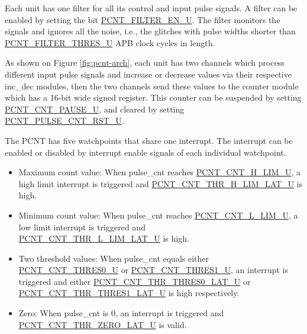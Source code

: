 \documentclass[main\_\_EN.tex]{subfiles}
\begin{document}
Each unit has one filter for all its control and input pulse signals. A filter can be enabled by setting the bit \hyperref[fielddesc:PCNTFILTERENUN]{PCNT\_FILTER\_EN\_U}. The filter monitors the signals and ignores all the noise, i.e., the glitches with pulse widths shorter than \hyperref[fielddesc:PCNTFILTERTHRESUN]{PCNT\_FILTER\_THRES\_U} APB clock cycles in length.

As shown on Figure \ref{fig:pcnt-arch}, each unit has two channels which process different input pulse signals and increase or decrease values via their respective inc\_dec modules, then the two channels send these values to the counter module which has a 16-bit wide signed register. This counter can be suspended by setting \hyperref[fielddesc:PCNTCNTPAUSEUN]{PCNT\_CNT\_PAUSE\_U}, and cleared by setting \hyperref[fielddesc:PCNTPULSECNTRSTUN]{PCNT\_PULSE\_CNT\_RST\_U}.

The PCNT has five watchpoints that share one interrupt. The interrupt can be enabled or disabled by interrupt enable signals of each individual watchpoint.

\begin{itemize}
    \item Maximum count value: When pulse\_cnt reaches \hyperref[fielddesc:PCNTCNTHLIMUN]{PCNT\_CNT\_H\_LIM\_U}, a high limit interrupt is triggered and \hyperref[fielddesc:PCNTCNTTHRHLIMLATUN]{PCNT\_CNT\_THR\_H\_LIM\_LAT\_U} is high.
    \item Minimum count value: When pulse\_cnt reaches \hyperref[fielddesc:PCNTCNTLLIMUN]{PCNT\_CNT\_L\_LIM\_U}, a low limit interrupt is triggered and \\\hyperref[fielddesc:PCNTCNTTHRLLIMLATUN]{PCNT\_CNT\_THR\_L\_LIM\_LAT\_U} is high.
    \item Two threshold values: When pulse\_cnt equals either \hyperref[fielddesc:PCNTCNTTHRES0UN]{PCNT\_CNT\_THRES0\_U} or \hyperref[fielddesc:PCNTCNTTHRES1UN]{PCNT\_CNT\_THRES1\_U}, an interrupt is triggered and either \hyperref[fielddesc:PCNTCNTTHRTHRES0LATUN]{PCNT\_CNT\_THR\_THRES0\_LAT\_U} or \hyperref[fielddesc:PCNTCNTTHRTHRES1LATUN]{PCNT\_CNT\_THR\_THRES1\_LAT\_U} is high respectively.
    \item Zero: When pulse\_cnt is 0, an interrupt is triggered and \hyperref[fielddesc:PCNTCNTTHRZEROLATUN]{PCNT\_CNT\_THR\_ZERO\_LAT\_U} is valid.
\end{itemize}
\end{document}
